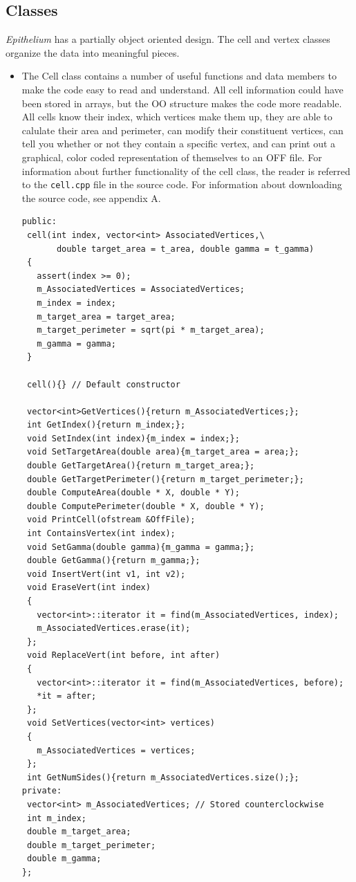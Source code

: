 \subsection{Classes}
\label{sec:class}
\emph{Epithelium} has a partially object oriented design. The cell and vertex classes organize the data into meaningful pieces.
\begin{itemize}
\item The {\color{red} Cell} class contains a number of useful functions and data members to make the code easy to read and understand. All cell information could have been stored in arrays, but the OO structure makes the code more readable. All cells know their index, which vertices make them up, they are able to calulate their area and perimeter, can modify their constituent vertices, can tell you whether or not they contain a specific vertex, and can print out a graphical, color coded representation of themselves to an OFF file. For information about further functionality of the cell class, the reader is referred to the \texttt{cell.cpp} file in the source code. For information about downloading the source code, see appendix A.
\begin{lstlisting}
public:
 cell(int index, vector<int> AssociatedVertices,\
       double target_area = t_area, double gamma = t_gamma)
 {	
   assert(index >= 0);
   m_AssociatedVertices = AssociatedVertices;
   m_index = index;
   m_target_area = target_area;
   m_target_perimeter = sqrt(pi * m_target_area);
   m_gamma = gamma; 
 }
	
 cell(){} // Default constructor
	
 vector<int>GetVertices(){return m_AssociatedVertices;};
 int GetIndex(){return m_index;};
 void SetIndex(int index){m_index = index;};
 void SetTargetArea(double area){m_target_area = area;};
 double GetTargetArea(){return m_target_area;};
 double GetTargetPerimeter(){return m_target_perimeter;};
 double ComputeArea(double * X, double * Y);
 double ComputePerimeter(double * X, double * Y);
 void PrintCell(ofstream &OffFile);
 int ContainsVertex(int index);
 void SetGamma(double gamma){m_gamma = gamma;};
 double GetGamma(){return m_gamma;};
 void InsertVert(int v1, int v2);
 void EraseVert(int index)
 {
   vector<int>::iterator it = find(m_AssociatedVertices, index); 
   m_AssociatedVertices.erase(it);
 };
 void ReplaceVert(int before, int after)
 {
   vector<int>::iterator it = find(m_AssociatedVertices, before); 
   *it = after;
 };
 void SetVertices(vector<int> vertices)
 {
   m_AssociatedVertices = vertices;
 };
 int GetNumSides(){return m_AssociatedVertices.size();};
private:
 vector<int> m_AssociatedVertices; // Stored counterclockwise
 int m_index;	
 double m_target_area;
 double m_target_perimeter;
 double m_gamma;
};


\end{lstlisting}
\end{itemize}
